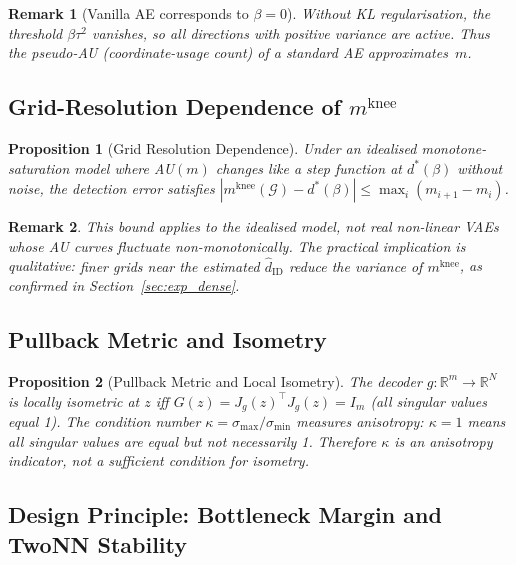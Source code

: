 \documentclass[11pt,a4paper]{article}
\newtheorem{proposition}{Proposition}
\newtheorem{remark}{Remark}
\newcommand{\Jg}{J_g}
\newcommand{\R}{\mathbb{R}}
\newcommand{\kap}{\kappa}
\newcommand{\mknee}{m^{\mathrm{knee}}}
\newcommand{\hatdID}{\hat{d}_{\mathrm{ID}}}
\begin{document}
\begin{remark}[Vanilla AE corresponds to $\beta=0$]
Without KL regularisation, the threshold $\beta\tau^2$ vanishes, so all
directions with positive variance are active.  Thus the pseudo-AU
(coordinate-usage count) of a standard AE approximates~$m$.
\end{remark}

\subsection{Grid-Resolution Dependence of $\mknee$}\label{sec:theory_grid}

\begin{proposition}[Grid Resolution Dependence]\label{thm:mknee_instab}
Under an idealised monotone-saturation model where AU$(m)$ changes like a step
function at $d^*(\beta)$ without noise, the detection error satisfies
$|\mknee(\mathcal{G})-d^*(\beta)|\leq\max_i(m_{i+1}-m_i)$.
\end{proposition}

\begin{remark}
This bound applies to the idealised model, not real non-linear VAEs whose AU
curves fluctuate non-monotonically.
The practical implication is qualitative: \emph{finer grids near the estimated
$\hatdID$ reduce the variance of $\mknee$}, as confirmed in Section~\ref{sec:exp_dense}.
\end{remark}

\subsection{Pullback Metric and Isometry}\label{sec:theory_pullback}

\begin{proposition}[Pullback Metric and Local Isometry]\label{thm:pullback}
The decoder $g:\R^m\!\to\R^N$ is locally isometric at $z$ iff
$G(z)=\Jg(z)^\top\Jg(z)=I_m$ (all singular values equal 1).
The condition number $\kap=\sigma_{\max}/\sigma_{\min}$ measures anisotropy:
$\kap=1$ means all singular values are \emph{equal} but not necessarily 1.
Therefore $\kap$ is an anisotropy indicator, not a sufficient condition for isometry.
\end{proposition}

\subsection{Design Principle: Bottleneck Margin and TwoNN Stability}
\label{sec:theory_dp}
\end{document}
